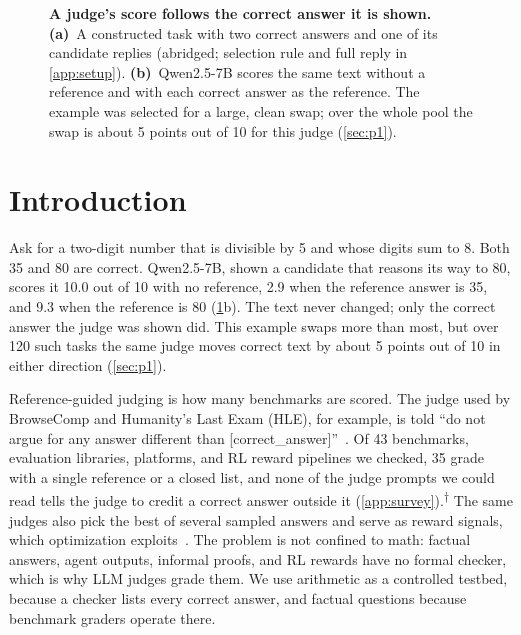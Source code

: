 \documentclass{article}
\newcommand{\ph}{\textsuperscript{$\dagger$}}
\begin{document}
\begin{figure}[!b]
\centering
\resizebox{0.64\textwidth}{!}{}
\caption{\textbf{A judge's score follows the correct answer it is shown.}
\textbf{(a)}~A constructed task with two correct answers and one of its candidate replies (abridged; selection rule and full reply in \cref{app:setup}).
\textbf{(b)}~Qwen2.5-7B scores the same text without a reference and with each correct answer as the reference. The example was selected for a large, clean swap; over the whole pool the swap is about 5 points out of 10 for this judge (\cref{sec:p1}).}
\label{fig:concept}
\end{figure}

\section{Introduction}
\label{sec:intro}

Ask for a two-digit number that is divisible by 5 and whose digits sum to 8.
Both 35 and 80 are correct.
Qwen2.5-7B, shown a candidate that reasons its way to 80, scores it 10.0 out of 10 with no reference, 2.9 when the reference answer is 35, and 9.3 when the reference is 80 (\cref{fig:concept}b).
The text never changed; only the correct answer the judge was shown did.
This example swaps more than most, but over 120 such tasks the same judge moves correct text by about 5 points out of 10 in either direction (\cref{sec:p1}).

Reference-guided judging is how many benchmarks are scored.
The judge used by BrowseComp and Humanity's Last Exam (HLE), for example, is told ``do not argue for any answer different than [correct\_answer]''~\citep{wei2025browsecomp,phan2025hle}.
Of 43 benchmarks, evaluation libraries, platforms, and RL reward pipelines we checked, 35 grade with a single reference or a closed list, and none of the judge prompts we could read tells the judge to credit a correct answer outside it (\cref{app:survey}).\ph{}
The same judges also pick the best of several sampled answers and serve as reward signals, which optimization exploits~\citep{gao2022scaling}.
The problem is not confined to math: factual answers, agent outputs, informal proofs, and RL rewards have no formal checker, which is why LLM judges grade them. We use arithmetic as a controlled testbed, because a checker lists every correct answer, and factual questions because benchmark graders operate there.
\end{document}
